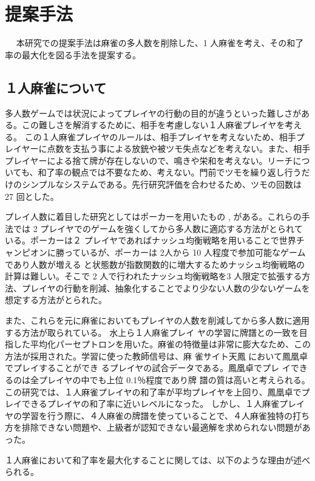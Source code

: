 \chapter{提案手法}　%
\label{chap:approach}
本研究での提案手法は麻雀の多人数を削除した、1 人麻雀を考え、その和了率の最大化を図る手法を提案する。

\section{１人麻雀について}
多人数ゲームでは状況によってプレイヤの行動の目的が違うといった難しさがある。この難しさを解消するために、相手を考慮しない１人麻雀プレイヤを考える。
この１人麻雀プレイヤのルールは、相手プレイヤを考えないため、相手プレイヤーに点数を支払う事による放銃や被ツモ失点などを考えない。また、相手プレイヤーによる捨て牌が存在しないので、鳴きや栄和を考えない。リーチについても、和了率の観点では不要なため、考えない。門前でツモを繰り返し行うだけのシンプルなシステムである。先行研究\cite{bakuuti}評価を合わせるため、ツモの回数は 27 回とした。

プレイ人数に着目した研究としてはポーカーを用いたもの \cite{poker},\cite{hurui} がある。これらの手法では 2 プレイヤでのゲームを強くしてから多人数に適応する方法がとられている。ポーカーは２ プレイヤであればナッシュ均衡戦略を用いることで世界チャンピオンに勝っているが、ポーカーは 2人から 10 人程度で参加可能なゲームであり人数が増える
と状態数が指数関数的に増大するためナッシュ均衡戦略の計算は難しい。そこで 2 人で行われたナッシュ均衡戦略を3 人限定で拡張する方法、プレイヤの行動を削減、抽象化することでより少ない人数の少ないゲームを想定する方法がとられた。

また、これらを元に麻雀においてもプレイヤの人数を削減してから多人数に適用する方法が取られている。
水上ら\cite{bakuuti}１人麻雀プレイ ヤの学習に牌譜との一致を目指した平均化パーセプトロンを用いた。麻雀の特徴量は非常に膨大なため、この方法が採用された。学習に使った教師信号は、麻 雀サイト天鳳 \cite{tenhou} において鳳凰卓でプレイすることができ るプレイヤの試合データである。鳳凰卓でプレ イできるのは全プレイヤの中でも上位 0.1％程度であり牌
譜の質は高いと考えられる。この研究では、１人麻雀プレイヤの和了率が平均プレイヤを上回り、鳳凰卓でプレイできるプレイヤの和了率に近いレベルになった。
しかし、１人麻雀プレイヤの学習を行う際に、４人麻雀の牌譜を使っていることで、４人麻雀独特の打ち方を排除できない問題や、上級者が認知できない最適解を求められない問題があった。

１人麻雀において和了率を最大化することに関しては、以下のような理由が述べられる。

